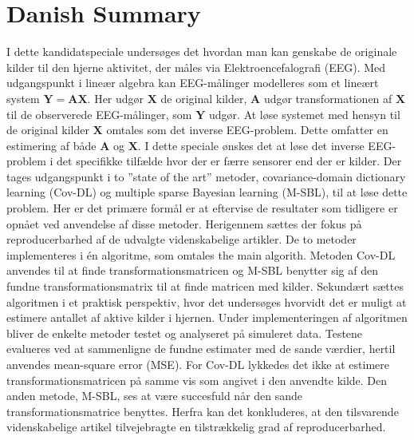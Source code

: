 \chapter*{Danish Summary}
I dette kandidatspeciale undersøges det hvordan man kan genskabe de originale kilder til den hjerne aktivitet, der måles via Elektroencefalografi (EEG). Med udgangspunkt i lineær algebra kan EEG-målinger modelleres som et lineært system $\mathbf{Y}=\mathbf{AX}$. 
Her udgør $\mathbf{X}$ de original kilder, $\mathbf{A}$ udgør transformationen af $\mathbf{X}$ til de observerede EEG-målinger, som $\mathbf{Y}$ udgør.   
At løse systemet med hensyn til de original kilder $\mathbf{X}$ omtales som det inverse EEG-problem. 
Dette omfatter en estimering af både $\mathbf{A}$ og $\mathbf{X}$.
I dette speciale ønskes det at løse det inverse EEG-problem i det specifikke tilfælde hvor der er færre sensorer end der er kilder.  
Der tages udgangspunkt i to ”state of the art” metoder, covariance-domain dictionary learning (Cov-DL) og multiple sparse Bayesian learning (M-SBL), til at løse dette problem. 
Her er det primære formål er at eftervise de resultater som tidligere er opnået ved anvendelse af disse metoder. Herigennem sættes der fokus på reproducerbarhed af de udvalgte videnskabelige artikler.  
De to metoder implementeres i én algoritme, som omtales the main algorith. 
Metoden Cov-DL anvendes til at finde transformationsmatricen og M-SBL benytter sig af den fundne transformationsmatrix til at finde matricen med kilder. 
Sekundært sættes algoritmen i et praktisk perspektiv, hvor det undersøges hvorvidt det er muligt at estimere antallet af aktive kilder i hjernen.
Under implementeringen af algoritmen bliver de enkelte metoder testet og analyseret på simuleret data. 
Testene evalueres ved at sammenligne de fundne estimater med de sande værdier, hertil anvendes mean-square error (MSE). 
For Cov-DL lykkedes det ikke at estimere transformationsmatricen på samme vis som angivet i den anvendte kilde.
Den anden metode, M-SBL, ses at være succesfuld når den sande transformationsmatrice benyttes. 
Herfra kan det konkluderes, at den tilsvarende videnskabelige artikel tilvejebragte en tilstrækkelig grad af reproducerbarhed.

